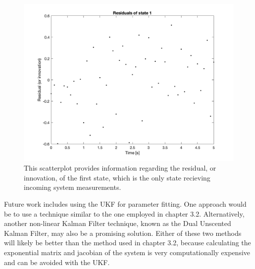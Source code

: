 \begin{figure}[h]
    \centering
    \includegraphics[scale = 0.6]{Meskin_residuals_state1.png}
    \caption{This scatterplot provides information regarding the residual, or innovation, of the first state, which is the only state recieving incoming system measurements.}
\end{figure}


\noindent Future work includes using the UKF for parameter fitting. One approach would be to use a technique similar to the one employed in chapter 3.2. Alternatively, another non-linear Kalman Filter technique, known as the Dual Unscented Kalman Filter, may also be a promising solution. Either of these two methods will likely be better than the method used in chapter 3.2, because calculating the exponential matrix and jacobian of the system is very computationally expensive and can be avoided with the UKF.














